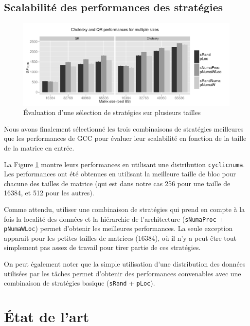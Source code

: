 \documentclass[parallelisme]{compas2016}
\begin{document}
\subsection{Scalabilité des performances des stratégies}

\begin{figure}[t]
  \centering
  \includegraphics[scale=0.5]{figures/graph_details_strat.pdf}
\vspace*{-2ex}
\caption{Évaluation d'une sélection de stratégies sur plusieurs tailles}
\label{fig:eval-strat-sizes}
\end{figure}

Nous avons finalement sélectionné les trois combinaisons de stratégies meilleures
que les performances de GCC pour évaluer leur scalabilité en fonction de la taille
de la matrice en entrée.

La Figure \ref{fig:eval-strat-sizes} montre leurs performances en utilisant une distribution
\verb/cyclicnuma/.
Les performances ont été obtenues en utilisant la meilleure taille de bloc pour
chacune des tailles de matrice (qui est dans notre cas 256 pour une taille de 16384,
et 512 pour les autres).

Comme attendu, utiliser une combinaison de stratégies qui prend en compte à la fois
la localité des données et la hiérarchie de l'architecture (\verb/sNumaProc/ + \verb/pNumaWLoc/)
permet d'obtenir les meilleures performances.
La seule exception apparait pour les petites tailles de matrices (16384), où il
n'y a peut être tout simplement pas assez de travail pour tirer partie de ces stratégies. 

On peut également noter que la simple utilisation d'une distribution des données
utilisées par les tâches permet d'obtenir des performances convenables avec une
combinaison de stratégies basique (\verb/sRand/ + \verb/pLoc/).

\section{État de l'art}
\label{sec:related-work}
\end{document}
